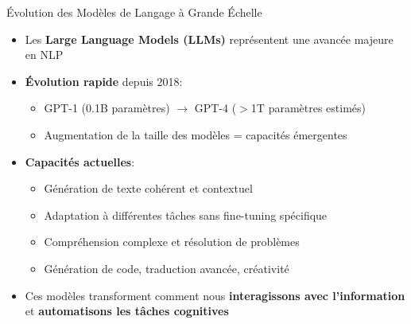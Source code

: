 \documentclass[aspectratio=169,11pt]{beamer}
\begin{document}
\begin{frame}{Évolution des Modèles de Langage à Grande Échelle}
    \begin{itemize}
        \item Les \textbf{Large Language Models (LLMs)} représentent une avancée majeure en NLP
        \item \textbf{Évolution rapide} depuis 2018:
        \begin{itemize}
            \item GPT-1 (0.1B paramètres) $\rightarrow$ GPT-4 ($>$1T paramètres estimés)
            \item Augmentation de la taille des modèles = capacités émergentes
        \end{itemize}
        \item \textbf{Capacités actuelles}:
        \begin{itemize}
            \item Génération de texte cohérent et contextuel
            \item Adaptation à différentes tâches sans fine-tuning spécifique
            \item Compréhension complexe et résolution de problèmes
            \item Génération de code, traduction avancée, créativité
        \end{itemize}
        \item Ces modèles transforment comment nous \textbf{interagissons avec l'information} et \textbf{automatisons les tâches cognitives}
    \end{itemize}
\end{frame}
\end{document}
